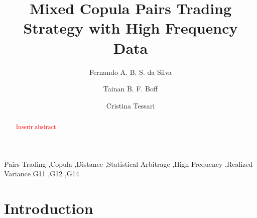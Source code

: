 \documentclass[review]{elsarticle}
\begin{document}
\begin{frontmatter}

\title{Mixed Copula Pairs Trading Strategy with High Frequency Data}



\author[address1]{Fernando A. B. S. da Silva}

\author[address2]{Tainan B. F. Boff}

\author[address3]{Cristina Tessari}

\address[address1]{Department of Statistics, Institute of Mathematics and Statistics, Federal University of Rio Grande do Sul, 9500 Bento Gonçalves Av., 43-111, Porto Alegre, RS, 91509-900, Brazil}
\address[address2]{Graduate Program in Economics, Federal University of Rio Grande do Sul, Porto Alegre, Brazil}
\address[address3]{Finance Division, Columbia Business School, Columbia University, New York, NY 10027, USA}

\begin{abstract}
\textcolor{red}{Inserir abstract.}
\end{abstract}

\begin{keyword}
Pairs Trading \sep Copula \sep Distance \sep Statistical Arbitrage \sep High-Frequency \sep Realized Variance %
\JEL  G11 \sep G12 \sep G14 
\end{keyword}

\end{frontmatter}

\linenumbers

\section{Introduction}
\end{document}
